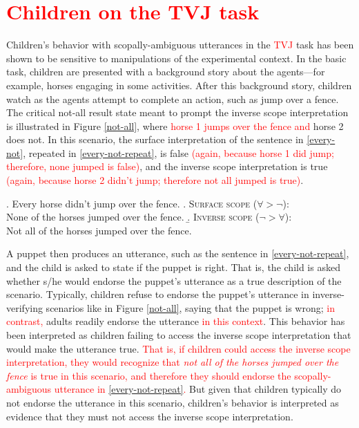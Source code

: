 \documentclass[preprint,authoryear]{elsarticle}\frenchspacing
\newcommand{\lp}[1]{\textcolor{red}{#1}} %
\begin{document}
\section{
\lp{Children on the TVJ task}
} \label{background}





Children's behavior with scopally-ambiguous utterances in the 
\lp{TVJ}
task has been shown to be sensitive to manipulations of the experimental context. In the basic task, children are presented with a background story about the agents---for example, horses engaging in some activities.  After this background story, children watch as the agents attempt to complete an action, such as jump over a fence. The critical not-all result state meant to prompt the inverse scope interpretation is illustrated in Figure \ref{not-all}, where \lp{horse 1 jumps over the fence and} horse 2 does not. In this scenario, the surface interpretation of the sentence in \ref{every-not}, repeated in \ref{every-not-repeat}, is false \lp{(again, because horse 1 did jump; therefore, none jumped is false)},  and the inverse scope interpretation is true \lp{(again, because horse 2 didn't jump; therefore not all jumped is true)}.  

\ex. \label{every-not-repeat}
Every horse didn't jump over the fence.
\a. \label{every-not-surface-repeat}
\textsc{Surface scope} ($\forall > \neg$):\\
None of the horses jumped over the fence.
\b. \label{every-not-inverse-repeat}
\textsc{Inverse scope} ($\neg > \forall$):\\
Not all of the horses jumped over the fence. 

A puppet then produces an utterance, such as the sentence in \ref{every-not-repeat}, and the child is asked to state if the puppet is right. That is, the child is asked  whether s/he would endorse the puppet's utterance as a true description of the scenario. Typically, children  refuse to endorse the puppet's utterance in inverse-verifying scenarios like in Figure \ref{not-all}, saying that the puppet is wrong; \lp{in contrast,} adults readily endorse the utterance \lp{in this context}. This behavior has been interpreted as children failing to access the inverse scope interpretation that would make the utterance true. 
\lp{That is, if children could access the inverse scope interpretation, they would recognize that \emph{not all of the horses jumped over the fence} is true in this scenario, and therefore they should endorse the scopally-ambiguous utterance in \ref{every-not-repeat}.} But given that children typically do not endorse the utterance in this scenario, children's behavior is interpreted as evidence that they must not access the inverse scope interpretation.
\end{document}
